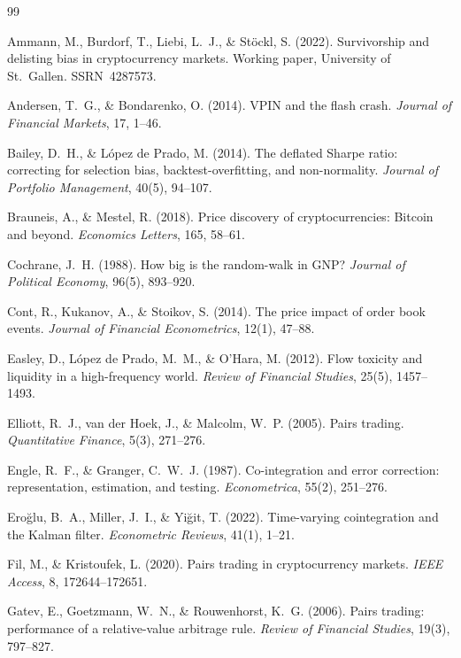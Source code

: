 \documentclass[11pt]{article}
\begin{document}
\begin{thebibliography}{99}

Ammann, M., Burdorf, T., Liebi, L.~J., \& St\"ockl, S. (2022). Survivorship and delisting bias
in cryptocurrency markets. Working paper, University of St.~Gallen. SSRN~4287573.

Andersen, T.~G., \& Bondarenko, O. (2014). VPIN and the flash crash.
\emph{Journal of Financial Markets}, 17, 1--46.

Bailey, D.~H., \& L\'opez de Prado, M. (2014). The deflated Sharpe ratio: correcting for
selection bias, backtest-overfitting, and non-normality. \emph{Journal of Portfolio
Management}, 40(5), 94--107.

Brauneis, A., \& Mestel, R. (2018). Price discovery of cryptocurrencies: Bitcoin and beyond.
\emph{Economics Letters}, 165, 58--61.

Cochrane, J.~H. (1988). How big is the random-walk in GNP? \emph{Journal of Political
Economy}, 96(5), 893--920.

Cont, R., Kukanov, A., \& Stoikov, S. (2014). The price impact of order book events.
\emph{Journal of Financial Econometrics}, 12(1), 47--88.

Easley, D., L\'opez de Prado, M.~M., \& O'Hara, M. (2012). Flow toxicity and liquidity
in a high-frequency world. \emph{Review of Financial Studies}, 25(5), 1457--1493.

Elliott, R.~J., van der Hoek, J., \& Malcolm, W.~P. (2005). Pairs trading.
\emph{Quantitative Finance}, 5(3), 271--276.

Engle, R.~F., \& Granger, C.~W.~J. (1987). Co-integration and error correction:
representation, estimation, and testing. \emph{Econometrica}, 55(2), 251--276.

Ero\u{g}lu, B.~A., Miller, J.~I., \& Yi\u{g}it, T. (2022). Time-varying cointegration and
the Kalman filter. \emph{Econometric Reviews}, 41(1), 1--21.

Fil, M., \& Kristoufek, L. (2020). Pairs trading in cryptocurrency markets.
\emph{IEEE Access}, 8, 172644--172651.

Gatev, E., Goetzmann, W.~N., \& Rouwenhorst, K.~G. (2006). Pairs trading: performance of a
relative-value arbitrage rule. \emph{Review of Financial Studies}, 19(3), 797--827.


\end{thebibliography}
\end{document}
